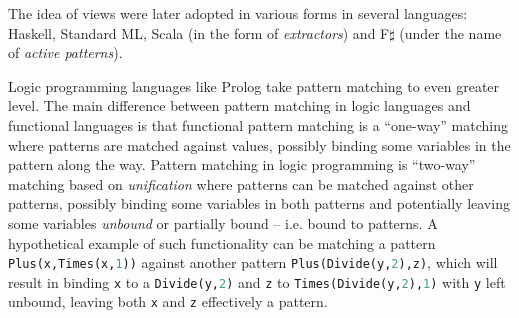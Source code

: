 \documentclass[preprint]{sigplanconf}
\DeclareRobustCommand{\codeocaml}[1]{{\lstinline[breaklines=false,language=Caml]{#1}}}
\begin{document}
The idea of views were later adopted in various forms in several languages: 
Haskell\cite{views96}, Standard ML\cite{views98}, Scala (in the form of 
\emph{extractors}\cite{EmirThesis}) and F$\sharp$ (under the name of 
\emph{active patterns}\cite{Syme07}).


Logic programming languages like Prolog take pattern matching to even greater 
level. The main difference between pattern matching in logic languages and 
functional languages is that functional pattern matching is a ``one-way'' 
matching where patterns are matched against values, possibly binding some 
variables in the pattern along the way. Pattern matching in logic programming is 
``two-way'' matching based on \emph{unification} where patterns can be matched 
against other patterns, possibly binding some variables in both patterns and 
potentially leaving some variables \emph{unbound} or partially bound -- i.e. 
bound to patterns. A hypothetical example of such functionality can be matching 
a pattern \codeocaml{Plus(x,Times(x,1))} against another pattern 
\codeocaml{Plus(Divide(y,2),z)}, which will result in binding \codeocaml{x} to a 
\codeocaml{Divide(y,2)} and \codeocaml{z} to \codeocaml{Times(Divide(y,2),1)} 
with \codeocaml{y} left unbound, leaving both \codeocaml{x} and \codeocaml{z} 
effectively a pattern.

\end{document}
